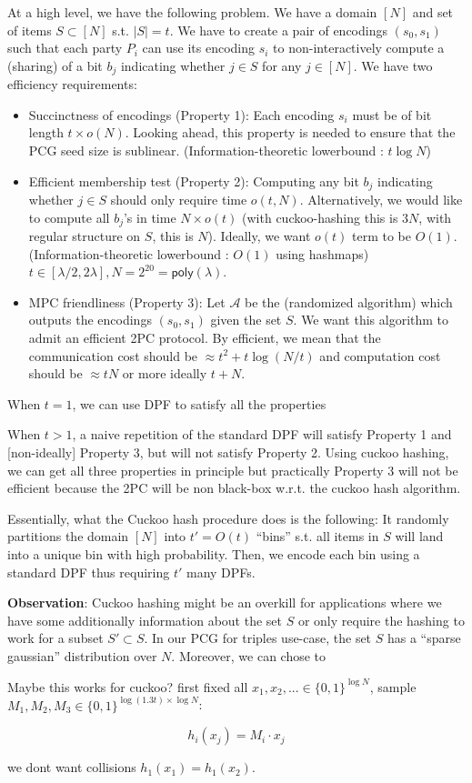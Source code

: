 At a high level, we have the following problem. We have a domain $[N]$ and set of items $S \subset [N]$ s.t. $|S| = t$. We have to create a pair of encodings $(s_0, s_1)$ such that each party $P_i$ can use its encoding $s_i$ to non-interactively compute a (sharing) of a bit $b_j$ indicating whether $j \in S$ for any $j \in [N]$. We have two efficiency requirements:

\begin{itemize}
  \item Succinctness of encodings (Property 1): Each encoding $s_i$ must be of bit length $t \times o(N)$. Looking ahead, this property is needed to ensure that the PCG seed size is sublinear. (Information-theoretic lowerbound : $t \log N$)
  \item Efficient membership test (Property 2): Computing any bit $b_j$ indicating whether $j \in S$ should only require time $o(t, N)$. Alternatively, we would like to compute all $b_j$'s in time $N \times o(t)$ (with cuckoo-hashing this is $3N$, with regular structure on $S$, this is $N$). Ideally, we want $o(t)$ term to be $O(1)$.
    (Information-theoretic lowerbound : $O(1)$ using hashmaps) $t\in [\lambda/2,2\lambda], N=2^{20}=\mathsf{poly}(\lambda)$.
  \item MPC friendliness (Property 3): Let $\mathcal{A}$ be the (randomized algorithm) which outputs the encodings $(s_0, s_1)$ given the set $S$. We want this algorithm to admit an efficient 2PC protocol. By efficient, we mean that the communication cost should be $\approx t^2+t\log(N/t)$ and computation cost should be $\approx tN$ or more ideally $t+N$.
\end{itemize}

When $t = 1$, we can use DPF to satisfy all the properties

When $t > 1$, a naive repetition of the standard DPF will satisfy Property 1 and [non-ideally] Property 3, but will not satisfy Property 2. Using cuckoo hashing, we can get all three properties in principle but practically Property 3 will not be efficient because the 2PC will be non black-box w.r.t. the cuckoo hash algorithm.

Essentially, what the Cuckoo hash procedure does is the following: It randomly partitions the domain $[N]$ into $t' = O(t)$ ``bins'' s.t. all items in $S$ will land into a unique bin with high probability. Then, we encode each bin using a standard DPF thus requiring $t'$ many DPFs.

\textbf{Observation}: Cuckoo hashing might be an overkill for applications where we have some additionally information about the set $S$ or only require the hashing to work for a subset $S' \subset S$. In our PCG for triples use-case, the set $S$ has a ``sparse gaussian'' distribution  over $N$. Moreover, we can chose to

Maybe this works for cuckoo? first fixed all $x_1,x_2,...\in \{0,1\}^{\log N}$, sample $M_1,M_2,M_3\in \{0,1\}^{\log(1.3t)\times \log N}$:

$$h_i(x_j) = M_i \cdot x_j$$

we dont want collisions $h_1(x_1)=h_1(x_2)$.
